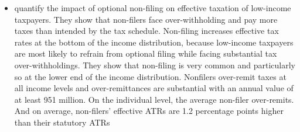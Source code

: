 \documentclass[12pt]{article}
\begin{document}
\begin{itemize}
    \item \textcite{hauck2024optional} quantify the impact of optional non-filing on effective taxation of low-income taxpayers. They show that non-filers face over-withholding and pay more taxes than intended by the tax schedule. Non-filing increases effective tax rates at the bottom of the income distribution, because low-income taxpayers are most likely to refrain from optional filing while facing substantial tax over-withholdings. They show that non-filing is very common and particularly so at the lower end of the income distribution. Nonfilers over-remit taxes at all income levels and over-remittances are substantial with an annual value of at least 951 million. On the individual level, the average non-filer over-remits. And on average, non-filers’ effective ATRs are 1.2 percentage points higher than their statutory ATRs
\end{itemize}




\newpage
\printbibliography
\end{document}
